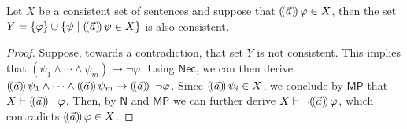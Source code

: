 \documentclass[sigconf,anonymous]{aamas}
\begin{document}
\begin{lemma}\label{lemma:diamond}
Let $X$ be a consistent set of sentences and suppose that $(\!( \vec{a} )\!)\,\varphi\in X$, then the set $Y=\{\varphi\}\cup\{\psi\mid (\!( \vec{a} )\!)\,\psi\in X\}$ is also consistent.
\end{lemma}
\begin{proof}
    Suppose, towards a contradiction, that set $Y$ is not consistent. This implies that $(\psi_1\land \cdots \land \psi_m)\to \neg \varphi$. Using $\mathsf{Nec}$, we can then derive $(\!( \vec{a} )\!)\,\psi_1 \land \cdots \land (\!( \vec a )\!)\,\psi_m\to (\!( \vec a )\!)\,\ \neg \varphi  $. Since $(\!( \vec{a} )\!)\,\psi_i\in X$, we conclude by $\mathsf{MP}$ that $X \vdash (\!( \vec a )\!)\, \neg \varphi$. Then, by $\mathsf{N}$ and $\mathsf{MP}$  we can further derive $X\vdash \neg (\!( \vec{a} )\!)\,\varphi$, which contradicts $(\!( \vec a )\!)\, \varphi\in X$. 
\end{proof}



\end{document}
